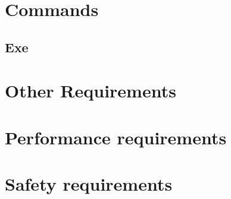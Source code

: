 \documentclass[10pt]{article}
\begin{document}
\section{Commands}

\subsection{Exe}


\section{Other Requirements}

\begin{appendices}

	\section{Performance requirements}

	\lipsum[10]

	\section{Safety requirements}

	\lipsum[10]

\end{appendices}
\end{document}
